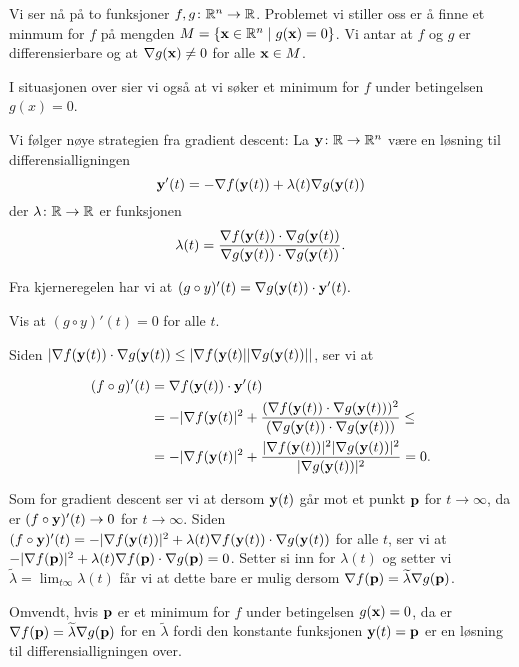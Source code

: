 Vi ser nå på to funksjoner $f, g \colon \mathbb{R}^n \to \mathbb{R}$. Problemet vi
stiller oss er å finne et minmum for $f$ på mengden $M = \{ \mathbf{x} \in \mathbb{R}^n \mid
g(\mathbf{x}) = 0 \}$. Vi antar at $f$ og $g$ er differensierbare og at $\nabla g(\mathbf{x})
\ne 0$ for alle $\mathbf{x} \in M$.

I situasjonen over sier vi også at vi søker et minimum for $f$ under betingelsen $g(x) = 0$.

Vi følger nøye strategien fra gradient descent: La $\mathbf{y} \colon \mathbb{R} \to \mathbb{R}^n$ være en
løsning til differensialligningen
$$\mathbf{y}'(t) = - \nabla f(\mathbf{y}(t)) + \lambda(t) \nabla g(\mathbf{y}(t))$$
der $\lambda \colon \mathbb{R} \to \mathbb{R}$ er funksjonen
$$\lambda(t) = \frac{\nabla f(\mathbf{y}(t)) \cdot \nabla g(\mathbf{y}(t))}{\nabla g(\mathbf{y}(t)) \cdot \nabla g(\mathbf{y}(t))}.$$

Fra kjerneregelen har vi at $(g \circ y)'(t) = \nabla g(\mathbf{y}(t)) \cdot \mathbf{y}'(t).$

\begin{oppgave}
  Vis at $(g \circ y)'(t) = 0$ for alle $t$.
\end{oppgave}

Siden $|\nabla f(\mathbf{y}(t)) \cdot \nabla g(\mathbf{y}(t)) \le |\nabla f(\mathbf{y}(t)| |\nabla g(\mathbf{y}(t))||$, ser vi at

\begin{align*}
  (f \circ g)'(t)
  &= \nabla f(\mathbf{y}(t)) \cdot \mathbf{y}'(t)\\
  &= -|\nabla f(\mathbf{y}(t)|^2 +
  \frac{(\nabla f(\mathbf{y}(t)) \cdot \nabla g(\mathbf{y}(t)))^2}
  {(\nabla g(\mathbf{y}(t)) \cdot \nabla g(\mathbf{y}(t)))}
  \le\\
  &= -|\nabla f(\mathbf{y}(t)|^2 +
  \frac{|\nabla f(\mathbf{y}(t))|^2 |\nabla g(\mathbf{y}(t))|^2}
  {|\nabla g(\mathbf{y}(t))|^2} = 0.
\end{align*}

Som for gradient descent ser vi at dersom $\mathbf{y}(t)$ går mot et punkt $\mathbf{p}$ for $t \to \infty$, da er
$(f \circ \mathbf{y})'(t) \to 0$ for $t \to \infty$. Siden 
$(f \circ \mathbf{y})'(t) = -| \nabla f(\mathbf{y}(t))|^2 + \lambda(t)\nabla f(\mathbf{y}(t)) \cdot \nabla
g(\mathbf{y}(t)) $ for alle $t$, ser vi at
$-| \nabla f(\mathbf{p})|^2 + \lambda(t)\nabla f(\mathbf{p}) \cdot \nabla g(\mathbf{p}) =0$.
Setter si inn for $\lambda(t)$ og setter vi $\widetilde \lambda = \lim_{t \infty} \lambda(t)$ 
får vi at dette bare er mulig dersom $\nabla f(\mathbf{p}) = \widetilde \lambda \nabla g(\mathbf{p})$.

Omvendt, hvis $\mathbf{p}$ er et minimum for $f$ under betingelsen $g(\mathbf{x}) = 0$,
da er $\nabla f(\mathbf{p}) = \widetilde \lambda \nabla g(\mathbf{p})$ for en
$\widetilde \lambda$ fordi den konstante funksjonen $\mathbf{y}(t) = \mathbf{p}$ er en løsning til differensialligningen
over.

